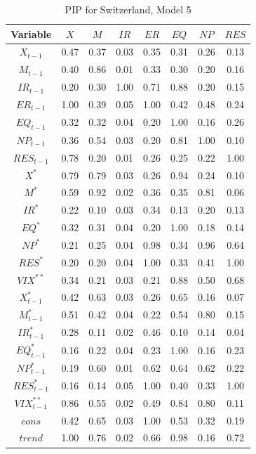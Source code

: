 \documentclass[a4paper, twoside]{templates/ociamthesis}
\begin{document}
\begin{table}[!ht]

\caption{\label{tab:TablePIPCH5}PIP for Switzerland, Model 5}
\centering
\fontsize{8}{10}\selectfont
\begin{tabular}[t]{cccccccc}
\toprule
Variable & $X$ & $M$ & $IR$ & $ER$ & $EQ$ & $NP$ & $RES$\\
\midrule
$X_{t-1}$ & 0.47 & 0.37 & 0.03 & 0.35 & 0.31 & 0.26 & 0.13\\
$M_{t-1}$ & 0.40 & 0.86 & 0.01 & 0.33 & 0.30 & 0.20 & 0.16\\
$IR_{t-1}$ & 0.20 & 0.30 & 1.00 & 0.71 & 0.88 & 0.20 & 0.15\\
$ER_{t-1}$ & 1.00 & 0.39 & 0.05 & 1.00 & 0.42 & 0.48 & 0.24\\
$EQ_{t-1}$ & 0.32 & 0.32 & 0.04 & 0.20 & 1.00 & 0.16 & 0.26\\
$NP_{t-1}$ & 0.36 & 0.54 & 0.03 & 0.20 & 0.81 & 1.00 & 0.10\\
$RES_{t-1}$ & 0.78 & 0.20 & 0.01 & 0.26 & 0.25 & 0.22 & 1.00\\
$X^*$ & 0.79 & 0.79 & 0.03 & 0.26 & 0.94 & 0.24 & 0.10\\
$M^*$ & 0.59 & 0.92 & 0.02 & 0.36 & 0.35 & 0.81 & 0.06\\
$IR^*$ & 0.22 & 0.10 & 0.03 & 0.34 & 0.13 & 0.20 & 0.13\\
$EQ^*$ & 0.32 & 0.31 & 0.04 & 0.20 & 1.00 & 0.18 & 0.14\\
$NP^*$ & 0.21 & 0.25 & 0.04 & 0.98 & 0.34 & 0.96 & 0.64\\
$RES^*$ & 0.20 & 0.20 & 0.04 & 1.00 & 0.33 & 0.41 & 1.00\\
$VIX^{**}$ & 0.34 & 0.21 & 0.03 & 0.21 & 0.88 & 0.50 & 0.68\\
$X^*_{t-1}$ & 0.42 & 0.63 & 0.03 & 0.26 & 0.65 & 0.16 & 0.07\\
$M^*_{t-1}$ & 0.51 & 0.42 & 0.04 & 0.22 & 0.54 & 0.80 & 0.15\\
$IR^*_{t-1}$ & 0.28 & 0.11 & 0.02 & 0.46 & 0.10 & 0.14 & 0.04\\
$EQ^*_{t-1}$ & 0.16 & 0.22 & 0.04 & 0.23 & 1.00 & 0.16 & 0.23\\
$NP^*_{t-1}$ & 0.19 & 0.60 & 0.01 & 0.62 & 0.64 & 0.62 & 0.22\\
$RES^*_{t-1}$ & 0.16 & 0.14 & 0.05 & 1.00 & 0.40 & 0.33 & 1.00\\
$VIX^{**}_{t-1}$ & 0.86 & 0.55 & 0.02 & 0.49 & 0.84 & 0.80 & 0.11\\
$cons$ & 0.42 & 0.65 & 0.03 & 1.00 & 0.53 & 0.32 & 0.19\\
$trend$ & 1.00 & 0.76 & 0.02 & 0.66 & 0.98 & 0.16 & 0.72\\
\bottomrule
\end{tabular}
\end{table}
\end{document}
